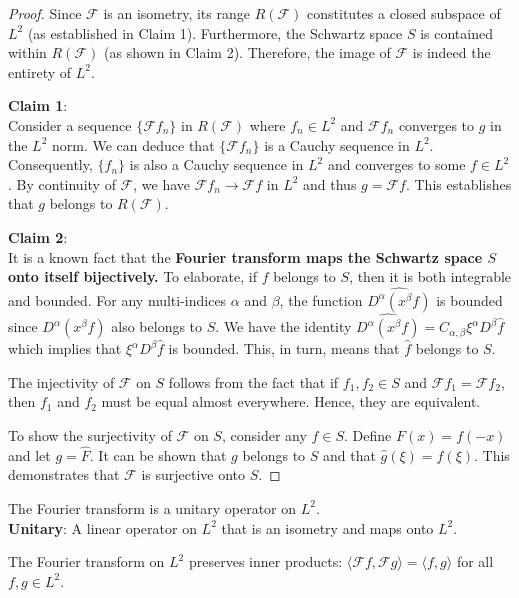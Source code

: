\begin{proof}
    Since $\mathcal{F}$ is an isometry, its range $R(\mathcal{F})$ constitutes a closed subspace of $L^2$ (as established in Claim 1). Furthermore, the Schwartz space $S$ is contained within $R(\mathcal{F})$ (as shown in Claim 2). Therefore, the image of $\mathcal{F}$ is indeed the entirety of $L^2$.

\noindent\textbf{Claim 1}:\\
Consider a sequence $\{\mathcal{F} f_n\}$ in $R(\mathcal{F})$ where $f_n \in L^2$ and $\mathcal{F} f_n$ converges to $g$ in the $L^2$ norm. We can deduce that $\{\mathcal{F} f_n\}$ is a Cauchy sequence in $L^2$. Consequently, $\{f_n\}$ is also a Cauchy sequence in $L^2$ and converges to some $f \in L^2$. By continuity of $\mathcal{F}$, we have $\mathcal{F} f_n \rightarrow \mathcal{F} f$ in $L^2$ and thus $g = \mathcal{F} f$. This establishes that $g$ belongs to $R(\mathcal{F})$.

\noindent\textbf{Claim 2}:\\
It is a known fact that the \textbf{Fourier transform maps the Schwartz space $S$ onto itself bijectively.}
To elaborate, if $f$ belongs to $S$, then it is both integrable and bounded. For any multi-indices $\alpha$ and $\beta$, the function $\widehat{D^\alpha(x^\beta f)}$ is bounded since $D^\alpha(x^\beta f)$ also belongs to $S$. We have the identity $\widehat{D^\alpha(x^\beta f)} = C_{\alpha, \beta} \xi^\alpha D^\beta \hat{f}$ which implies that $\xi^\alpha D^\beta \hat{f}$ is bounded. This, in turn, means that $\hat{f}$ belongs to $S$.

The injectivity of $\mathcal{F}$ on $S$ follows from the fact that if $f_1, f_2 \in S$ and $\mathcal{F} f_1 = \mathcal{F} f_2$, then $f_1$ and $f_2$ must be equal almost everywhere. Hence, they are equivalent.

To show the surjectivity of $\mathcal{F}$ on $S$, consider any $f \in S$. Define $F(x) = f(-x)$ and let $g = \hat{F}$. It can be shown that $g$ belongs to $S$ and that $\hat{g}(\xi) = f(\xi)$. This demonstrates that $\mathcal{F}$ is surjective onto $S$.
\end{proof}
\begin{theorem}
    The Fourier transform is a unitary operator on $L^2$. \\
    \noindent\textbf{Unitary}: A linear operator on $L^2$ that is an isometry and maps onto $L^2$.
\end{theorem}
\begin{corollary}
    The Fourier transform on $L^2$ preserves inner products: $\langle\mathcal{F}f, \mathcal{F}g\rangle = \langle f, g\rangle$ for all $f, g \in L^2$.
\end{corollary}
